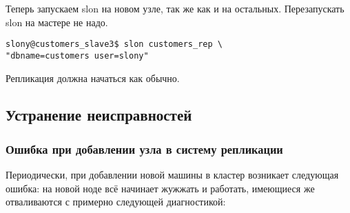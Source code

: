 Теперь запускаем slon на новом узле, так же как и на остальных. Перезапускать slon на мастере не надо.

\begin{lstlisting}[label=lst:slony16,caption=Общие задачи]
slony@customers_slave3$ slon customers_rep \
"dbname=customers user=slony"
\end{lstlisting}

Репликация должна начаться как обычно.

\subsection{Устранение неисправностей}

\subsubsection{Ошибка при добавлении узла в систему репликации}

Периодически, при добавлении новой машины в кластер возникает следующая ошибка: на новой ноде всё начинает жужжать и работать, имеющиеся же отваливаются с примерно следующей диагностикой:

